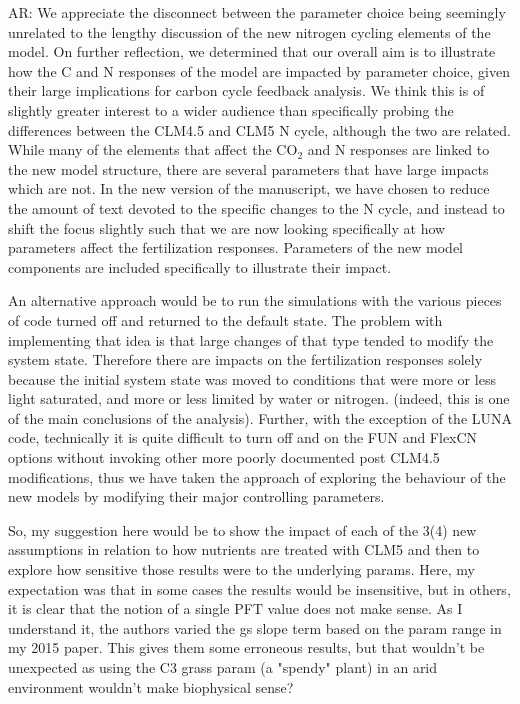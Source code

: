 \documentclass{article}
\begin{document}
\textsf{AR: We appreciate the disconnect between the parameter choice being seemingly unrelated to the lengthy discussion of the new nitrogen cycling elements of the model. On further reflection,  we determined that our overall aim is to illustrate how the C and N responses of the model are impacted by parameter choice, given their large implications for carbon cycle feedback analysis. We think this is of slightly greater interest to a wider audience than specifically probing the differences between the CLM4.5 and CLM5 N cycle, although the two are related.  While many of the elements that affect the CO$_{2}$ and N responses are linked to the new model structure, there are several parameters that have large impacts which are not. In the new version of the manuscript, we have chosen to reduce the amount of text devoted to the specific changes to the N cycle, and instead to shift the focus slightly such that we are now looking specifically at how parameters affect the fertilization responses. Parameters of the new model components are included specifically to illustrate their impact. }

\textsf{An alternative approach would be to run the simulations with the various pieces of code turned off and returned to the default state. The problem with implementing that idea is that large changes of that type tended to modify the system state.  Therefore there are impacts on the fertilization responses solely because the initial system state was moved to conditions that were more or less light saturated, and more or less limited by water or nitrogen. (indeed, this is one of the main conclusions of the analysis). Further, with the exception of the LUNA code, technically it is quite difficult to turn off and on the FUN and FlexCN options without invoking other more poorly documented post CLM4.5 modifications, thus we have taken the approach of exploring the behaviour of the new models by modifying their major controlling parameters.}

So, my suggestion here would be to show the impact of each of the 3(4) new assumptions in relation to how nutrients are treated with CLM5 and then to explore how sensitive those results were to the underlying params. Here, my expectation was that in some cases the results would be insensitive, but in others, it is clear that the notion of a single PFT value does not make sense. As I understand it, the authors varied the gs slope term based on the param range in my 2015 paper. This gives them some erroneous results, but that wouldn't be unexpected as using the C3 grass param (a "spendy" plant) in an arid environment wouldn't make biophysical sense?
\end{document}
